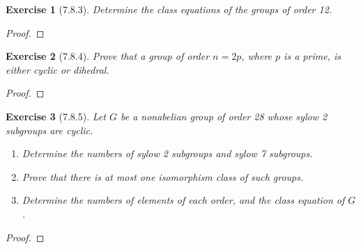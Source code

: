 \documentclass[12pt]{article}
\newtheorem*{exer}{Exercise}
\begin{document}
\begin{exer}[7.8.3]

    Determine the class equations of the groups of order 12.

\end{exer}

\begin{proof}

\end{proof}


\begin{exer}[7.8.4]

    Prove that a group of order $n = 2p$, where $p$ is a prime, is
    either cyclic or dihedral.

\end{exer}

\begin{proof}

\end{proof}


\begin{exer}[7.8.5]

    Let $G$ be a nonabelian group of order 28 whose sylow 2 subgroups
    are cyclic.

    \begin{enumerate}
        \item Determine the numbers of sylow 2 subgroups and sylow 7
            subgroups.

        \item Prove that there is at most one isomorphism class of such
            groups.

        \item Determine the numbers of elements of each order, and the
            class equation of $G$.
    \end{enumerate}

\end{exer}

\begin{proof}

\end{proof}

\end{document}

